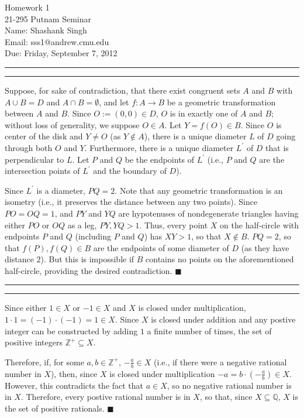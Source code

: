 \documentclass[11pt]{article}
\makeatletter
\newcounter{questionCounter}
\newcounter{partCounter}[questionCounter]
\newenvironment{question}[2][\arabic{questionCounter}]{%
    \setcounter{partCounter}{0}%
    \vspace{.25in} \hrule \vspace{0.5em}%
        \noindent{\bf #2}%
    \vspace{0.8em} \hrule \vspace{.10in}%
    \addtocounter{questionCounter}{1}%
}{}
\newcommand{\myname}{Shashank Singh}
\newcommand{\myandrew}{sss1@andrew.cmu.edu}
\newcommand{\myclass}{21-295 Putnam Seminar}
\newcommand{\myhwnum}{1}
\newcommand{\duedate}{Friday, September 7, 2012}
\renewcommand{\qed}{\quad $\blacksquare$}
\makeatother
\begin{document}
\thispagestyle{plain}

{\Large Homework \myhwnum} \\
\myclass \\
Name: \myname \\
Email: \myandrew \\
Due: \duedate \\
\begin{question}{Putnam 1964/B6}
Suppose, for sake of contradiction, that there exist congruent sets $A$ and
$B$ with $A \cup B = D$ and $A \cap B = \emptyset$, and let
$f:A \rightarrow B$ be a geometric transformation between $A$ and $B$.
Since $O := (0,0) \in D$, $O$ is in exactly one of $A$ and $B$; without loss
of generality, we suppose $O \in A$. Let $Y = f(O) \in B$. Since
$O$ is center of the disk and $Y \neq O$ (as $Y \not \in A$),
there is a unique diameter $L$ of $D$ going through both $O$ and $Y$.
Furthermore, there is a unique diameter $L^{\prime}$ of $D$ that is
perpendicular to $L$. Let $P$ and $Q$ be the endpoints of $L^{\prime}$ (i.e.,
$P$ and $Q$ are the intersection points of $L^{\prime}$ and the boundary of
$D$).

Since $L^{\prime}$ is a diameter, $PQ = 2$. Note that any geometric
transformation is an isometry (i.e., it preserves the distance between any two
points). Since $PO = OQ = 1$, and $PY$ and $YQ$ are hypotenuses of
nondegenerate triangles having either $PO$ or $OQ$ as a leg, $PY, YQ > 1$.
Thus, every point $X$ on the half-circle with endpoints $P$ and $Q$ (including
$P$ and $Q$) has $XY > 1$, so that $X \not \in B$. $PQ = 2$, so that
$f(P),f(Q) \in B$ are the endpoints of some diameter of $D$ (as they have
distance $2$). But this is impossible if $B$ contains no points on the
aforementioned half-circle, providing the desired contradiction. \qed
\end{question}

\begin{question}{Putnam 1962/A6.}
Since either $1 \in X$ or $-1 \in X$ and $X$ is closed under multiplication,
$1 \cdot 1 = (-1) \cdot (-1) = 1 \in X$. Since $X$ is closed under addition
and any postive integer can be constructed by adding $1$ a finite number of
times, the set of positive integers $\mathbb{Z}^+ \subseteq X$.

Therefore, if, for some $a,b \in \mathbb{Z}^+$, $-\frac{a}{b} \in X$ (i.e., if
there were a negative rational number in $X$), then, since $X$ is closed under
multiplication $-a = b \cdot \left(-\frac{a}{b}\right) \in X$. However, this
contradicts the fact that $a \in X$, so no negative rational number is in $X$.
Therefore, every postive rational number is in $X$, so that, since
$X \subseteq \mathbb{Q}$, $X$ is the set of positive rationals. \qed
\end{question}
\end{document}
